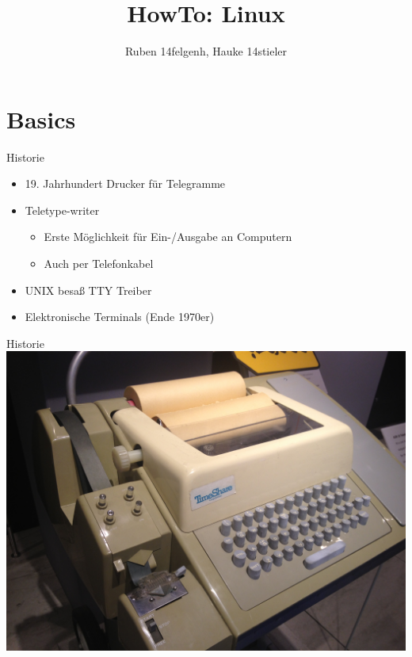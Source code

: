 \documentclass[compress]{beamer}
\title{HowTo: Linux}
\author{Ruben 14felgenh, Hauke 14stieler}
\date{\protect\displaydate{datex}}
\begin{document}
    \begin{frame}
        \titlepage
    \end{frame}

\section{Basics}

\begin{frame}{Historie}
    \begin{itemize}
        \item 19. Jahrhundert Drucker für Telegramme
        \item Teletype-writer
        \begin{itemize}
            \item Erste Möglichkeit für Ein-/Ausgabe an Computern
            \item Auch per Telefonkabel
        \end{itemize}
        \item UNIX besaß TTY Treiber
        \item Elektronische Terminals (Ende 1970er)
    \end{itemize}
\end{frame}


\begin{frame}{Historie}
    \centering\includegraphics[height=0.9\textheight]{tty}
\end{frame}
\end{document}
